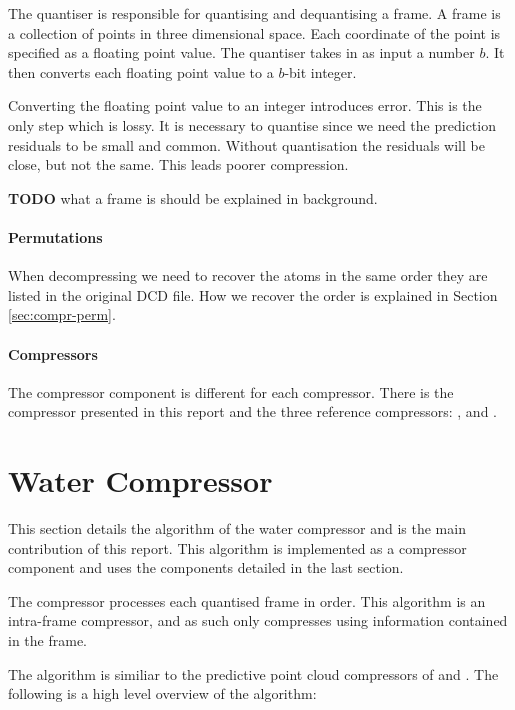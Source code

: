 \documentclass{report}
\newcommand{\todo}{\textbf{TODO} }
\begin{document}
The quantiser is responsible for quantising and dequantising a frame. A frame
is a collection of points in three dimensional space. Each coordinate of the
point is specified as a floating point value. The quantiser takes in as input
a number $b$. It then converts each floating point value to a $b$-bit integer.

Converting the floating point value to an integer introduces error. This is
the only step which is lossy. It is necessary to quantise since we need the
prediction residuals to be small and common. Without quantisation the
residuals will be close, but not the same. This leads poorer compression.

\todo what a frame is should be explained in background.


\paragraph{Permutations}

When decompressing we need to recover the atoms in the same order they are
listed in the original DCD file. How we recover the order is explained in
Section \ref{sec:compr-perm}.


\paragraph{Compressors}

The compressor component is different for each compressor. There is the
compressor presented in this report and the three reference compressors:
\citep{omeltchenko2000sls}, \citep{gumholdcomp} and \citep{devillers2000gci}.


\section{Water Compressor}

This section details the algorithm of the water compressor and is the main
contribution of this report. This algorithm is implemented as a compressor
component and uses the components detailed in the last section.

The compressor processes each quantised frame in order. This algorithm is an
intra-frame compressor, and as such only compresses using information
contained in the frame.

The algorithm is similiar to the predictive point cloud compressors of
\citep{gumholdcomp} and \citep{merrycomp}. The following is a high level
overview of the algorithm:
\end{document}
